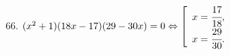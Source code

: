 66. $(x^2+1)(18x-17)(29-30x)=0 \Leftrightarrow \left[\begin{array}{l}x=\cfrac{17}{18},\\ x=\cfrac{29}{30}.\end{array}\right.$\\
